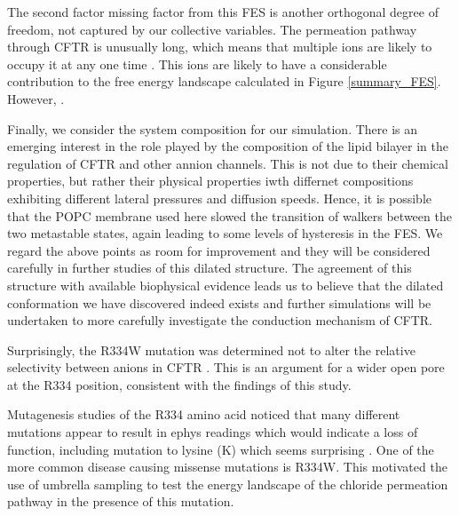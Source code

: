The second factor missing factor from this FES is another orthogonal degree of freedom, not captured by our collective variables. The permeation pathway through CFTR is unusually long, which means that multiple ions are likely to occupy it at any one time \cite{}. This ions are likely to have a considerable contribution to the free energy landscape calculated in Figure \ref{summary_FES}. However, .

Finally, we consider the system composition for our simulation. There is an emerging interest in the role played by the composition of the lipid bilayer in the regulation of CFTR and other annion channels. This is not due to their chemical properties, but rather their physical properties iwth differnet compositions exhibiting different lateral pressures and diffusion speeds. Hence, it is possible that the POPC membrane used here slowed the transition of walkers between the two metastable states, again leading to some levels of hysteresis in the FES. We regard the above points as room for improvement and they will be considered carefully in further studies of this dilated structure. The agreement of this structure with available biophysical evidence leads us to believe that the dilated conformation we have discovered indeed exists and further simulations will be undertaken to more carefully investigate the conduction mechanism of CFTR. 

Surprisingly, the R334W mutation was determined not to alter the relative selectivity between anions in CFTR \cite{sheppard1993}. This is an argument for a wider open pore at the R334 position, consistent with the findings of this study.

Mutagenesis studies of the R334 amino acid noticed that many different mutations appear to result in ephys readings which would indicate a loss of function, including mutation to lysine (K) which seems surprising \cite{ge2004, gong2004, linsdell2021}. One of the more common disease causing missense mutations is R334W. This motivated the use of umbrella sampling to test the energy landscape of the chloride permeation pathway in the presence of this mutation. 

